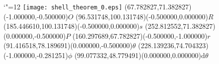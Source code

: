 \documentclass[12pt]{article}
\begin{document}
\makeatletter%
\let\ASYencoding\f@encoding%
\let\ASYfamily\f@family%
\let\ASYseries\f@series%
\let\ASYshape\f@shape%
\makeatother%
{\catcode`"=12%
\texttt{[image: shell\_theorem\_0.eps]}%
}%
\kern -263.519167pt%
\color{ASYcolor}
\fontsize{12.000000}{14.400000}\selectfont
\usefont{\ASYencoding}{\ASYfamily}{\ASYseries}{\ASYshape}%
\ASYalign(67.782827,71.382827)(-1.000000,-0.500000){$O$}%
\color{ASYcolor}
\fontsize{12.000000}{14.400000}\selectfont
\ASYalign(96.531748,100.131748)(-0.500000,0.000000){$R$}%
\color{ASYcolor}
\fontsize{12.000000}{14.400000}\selectfont
\ASYalign(185.446610,100.131748)(-0.500000,0.000000){$s$}%
\color{ASYcolor}
\fontsize{12.000000}{14.400000}\selectfont
\ASYalign(252.812552,71.382827)(0.000000,-0.500000){$P$}%
\color{ASYcolor}
\fontsize{12.000000}{14.400000}\selectfont
\ASYalign(160.297689,67.782827)(-0.500000,-1.000000){$r$}%
\color{ASYcolor}
\fontsize{12.000000}{14.400000}\selectfont
\ASYalign(91.416518,78.189691)(0.000000,-0.500000){$\theta$}%
\color{ASYcolor}
\fontsize{12.000000}{14.400000}\selectfont
\ASYalign(228.139236,74.704323)(-1.000000,-0.281251){$\phi$}%
\color{ASYcolor}
\fontsize{12.000000}{14.400000}\selectfont
\ASYalign(99.077332,48.779491)(0.000000,0.000000){$\mathrm{d}\theta$}%
\end{document}
